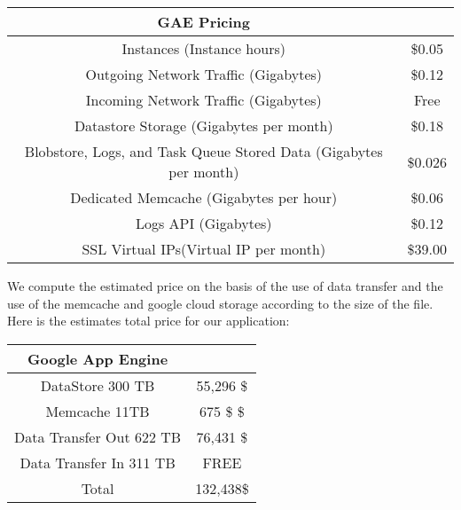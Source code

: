 \documentclass{article}
\begin{document}
\begin{center}

   \begin{tabular}{ | c | c | }

	\hline

    GAE Pricing & \\ \hline

	Instances 	(Instance hours) &	\$0.05\\ \hline

	Outgoing Network Traffic (Gigabytes) &	\$0.12\\ \hline

	Incoming Network Traffic 	(Gigabytes) &	Free\\ \hline

	Datastore Storage 	(Gigabytes per month) &	\$0.18\\ \hline

	Blobstore, Logs, and Task Queue Stored Data 	(Gigabytes per month) &	\$0.026\\ \hline

	Dedicated Memcache 	(Gigabytes per hour) &	\$0.06\\ \hline

	Logs API 	(Gigabytes) &	\$0.12\\ \hline	

	SSL Virtual IPs(Virtual IP per month) &	\$39.00\\

	\hline

   \end{tabular}

 \end{center}



We compute the estimated price on the basis of the use of data transfer and the use of the memcache and google cloud storage according to the size of the file. Here is the estimates total price for our application:



\begin{center}

   \begin{tabular}{ | c | c | }

     \hline

     Google App Engine &  \\ \hline

     DataStore 300 TB  & 55,296 \$\\ \hline

     Memcache 11TB  & 675 \$ \$\\ \hline

     Data Transfer Out 622 TB & 76,431 \$ \\ \hline

     Data Transfer In 311 TB & FREE\\ \hline

     Total & 132,438\$ \\

     \hline

   \end{tabular}

 \end{center}
\end{document}
